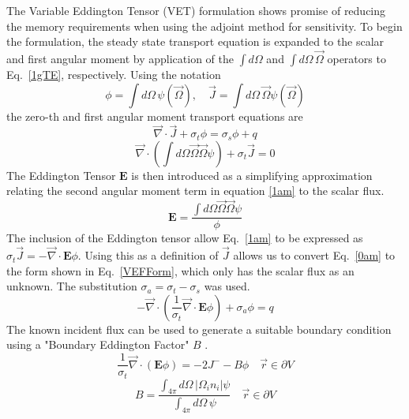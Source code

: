 \documentclass{article}
\newcommand{\vr}{\vec{r}}
\newcommand{\vO}{\vec{\Omega}}
\newcommand{\vdiv}{\vec{\nabla} \cdot}
\newcommand{\bound}{\partial V}
\newcommand{\Edd}{\mathbf{E}}
\newcommand{\sigt}{\sigma_t}
\newcommand{\sigs}{\sigma_s}
\newcommand{\siga}{\sigma_a}
\newcommand{\scalSource}{q}
\begin{document}
The Variable Eddington Tensor (VET) formulation shows promise of reducing the memory requirements when using the adjoint method for sensitivity. To begin the formulation, the steady state transport equation is expanded to the scalar and first angular moment by application of the $\int d \Omega$ and $\int d \Omega \, \vO$ operators to Eq.~\eqref{1gTE}, respectively. Using the notation
\begin{equation}
\phi=\int d\Omega \, \psi( \vO )
,\quad
\vec{J}= \int d\Omega \, \vO \psi( \vO )
\end{equation}
the zero-th and first angular moment transport equations are
\begin{equation}
\label{0am}
\vdiv \vec{J} + \sigt \phi = \sigs \phi + \scalSource
\end{equation}
\begin{equation}
\label{1am}
\vdiv \left(  \int d\Omega \vO \vO \psi \right) + \sigt \vec{J} =0 
\end{equation}
The Eddington Tensor $\Edd$ is then introduced as a simplifying approximation relating the second angular moment term in equation \ref{1am} to the scalar flux. 
\begin{equation}
\label{EddDef}
\Edd=\frac{\int d\Omega \vO \vO \psi}{\phi}
\end{equation}
The inclusion of the Eddington tensor allow Eq.~\eqref{1am} to be expressed as $\sigt \vec{J} = - \vdiv \Edd \phi$. Using this as a definition of $\vec{J}$ allows us to convert Eq.~\eqref{0am} to the form shown in Eq.~\eqref{VEFForm}, which only has the scalar flux as an unknown. The substitution $\siga = \sigt-\sigs$ was used.
\begin{equation}
\label{VEFForm}
- \vdiv \left( \frac{1}{\sigt}\vdiv \Edd \phi \right) + \siga \phi = \scalSource
\end{equation}
The known incident flux can be used to generate a suitable boundary condition using a "Boundary Eddington Factor" $B$ \cite{Miften}.
\begin{equation}
\frac{1}{\sigma_{t} } \vec{\nabla} \cdot \left(\Edd \phi \right)  = - 2J^- - B \phi \quad \vr \in \bound
\end{equation}
\begin{equation}
B= \frac{\int_{4 \pi} d\Omega \, \left| \Omega_i n_i \right | \psi}{\int_{4\pi} d\Omega \, \psi} \quad \vr \in \bound
\end{equation}

\end{document}
